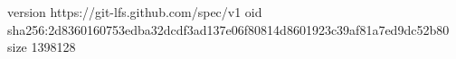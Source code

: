 version https://git-lfs.github.com/spec/v1
oid sha256:2d8360160753edba32dcdf3ad137e06f80814d8601923c39af81a7ed9dc52b80
size 1398128
